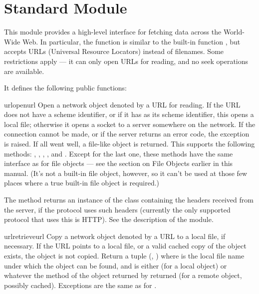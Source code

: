 \section{Standard Module }
\label{module-urllib}

\renewcommand{\indexsubitem}{(in module urllib)}

This module provides a high-level interface for fetching data across
the World-Wide Web.  In particular, the  function is
similar to the built-in function , but accepts URLs
(Universal Resource Locators) instead of filenames.  Some restrictions
apply --- it can only open URLs for reading, and no seek operations
are available.

It defines the following public functions:

\begin{funcdesc}{urlopen}{url}
Open a network object denoted by a URL for reading.  If the URL does
not have a scheme identifier, or if it has  as its scheme
identifier, this opens a local file; otherwise it opens a socket to a
server somewhere on the network.  If the connection cannot be made, or
if the server returns an error code, the  exception is
raised.  If all went well, a file-like object is returned.  This
supports the following methods: , ,
, ,  and .
Except for the last one, these methods have the same interface as for
file objects --- see the section on File Objects earlier in this
manual.  (It's not a built-in file object, however, so it can't be
used at those few places where a true built-in file object is
required.)

The  method returns an instance of the class
 containing the headers received from the server,
if the protocol uses such headers (currently the only supported
protocol that uses this is HTTP).  See the description of the
 module.
\end{funcdesc}

\begin{funcdesc}{urlretrieve}{url}
Copy a network object denoted by a URL to a local file, if necessary.
If the URL points to a local file, or a valid cached copy of the
object exists, the object is not copied.  Return a tuple (,
) where  is the local file name under which
the object can be found, and  is either  (for
a local object) or whatever the  method of the object
returned by  returned (for a remote object, possibly
cached).  Exceptions are the same as for .
\end{funcdesc}

